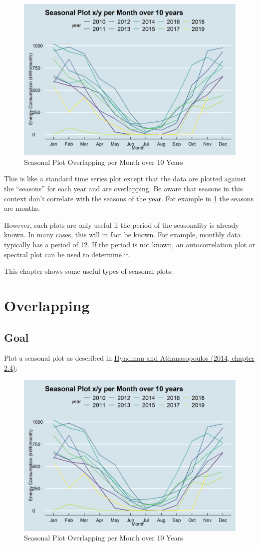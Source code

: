\documentclass[
  a4paperpaper,
]{book}
\begin{document}
\begin{figure}
\includegraphics[width=0.7\linewidth]{images/plotSeasonalXY} \caption{Seasonal Plot Overlapping per Month over 10 Years}\label{fig:figplotSeasonalXY}
\end{figure}

This is like a standard time series plot except that the data are plotted against the ``seasons'' for each year and are overlapping. Be aware that seasons in this context don't correlate with the seasons of the year. For example in \ref{fig:figplotSeasonalXY} the seasons are months.

However, such plots are only useful if the period of the seasonality is already known. In many cases, this will in fact be known. For example, monthly data typically has a period of 12. If the period is not known, an autocorrelation plot or spectral plot can be used to determine it.

This chapter shows some useful types of seasonal plots.

\hypertarget{overlapping}{%
\section{Overlapping}\label{overlapping}}

\hypertarget{goal}{%
\subsection{Goal}\label{goal}}

Plot a seasonal plot as described in \href{https://otexts.com/fpp2/seasonal-plots.html}{Hyndman and Athanasopoulos (2014, chapter 2.4)}:

\begin{figure}
\includegraphics[width=0.7\linewidth]{images/plotSeasonalXY} \caption{Seasonal Plot Overlapping per Month over 10 Years}\label{fig:unnamed-chunk-8}
\end{figure}
\end{document}
